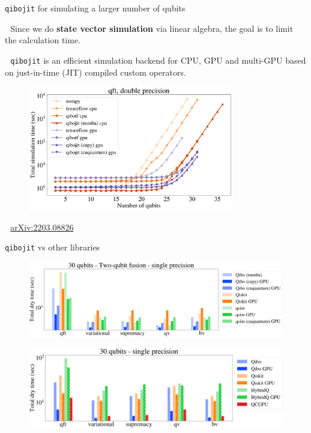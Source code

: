 \documentclass[8pt, xcolor={svgnames}, hyperref={colorlinks,linkcolor=black, citecolor=amethyst, urlcolor=amethyst}]{beamer}
\begin{document}
\begin{frame}{\texttt{qibojit} for simulating a larger number of qubits}
\large 

\faArrowCircleRight\,\, Since we do \textbf{state vector simulation} via linear algebra, the goal is to limit the calculation time.

\faArrowCircleRight\,\, \texttt{qibojit} is an efficient simulation backend for CPU, GPU and multi-GPU based on just-in-time (JIT) compiled custom operators. 

    \begin{figure}
    \centering 
    \includegraphics[width=0.8\textwidth]{figures/qibojit-qft.png}
  \end{figure}
  
  \faBook\,\, \href{https://arxiv.org/abs/2203.08826}{arXiv:2203.08826}
\end{frame}

\begin{frame}{\texttt{qibojit} vs other libraries}
\large 

\begin{figure}
    \centering 
    \includegraphics[width=1\textwidth]{figures/libraries.png}
\end{figure}

\begin{figure}
    \centering 
    \includegraphics[width=1\textwidth]{figures/lib-2.png}
  \end{figure}
    
\end{frame}
\end{document}
